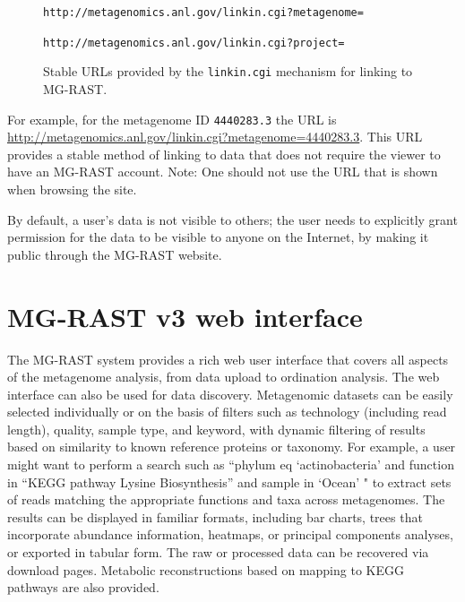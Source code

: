 \documentclass[12pt,fullpage]{report}
\begin{document}
\begin{figure}[ht]

\texttt{http://metagenomics.anl.gov/linkin.cgi?metagenome=}

\texttt{http://metagenomics.anl.gov/linkin.cgi?project=}

\caption{Stable URLs provided by the \texttt{linkin.cgi} mechanism for linking to MG-RAST.}
\label{fig:linkin.cgi}

\end{figure}

\noindent
For example, for the metagenome ID \texttt{4440283.3} the URL is \url{http://metagenomics.anl.gov/linkin.cgi?metagenome=4440283.3}.
This URL provides a stable method of linking to data that does not require the viewer to have an MG-RAST account. Note: One should not use the URL that is shown when browsing the site.

By default, a user's data is not visible to others; the user needs to explicitly grant permission for the data to be visible to anyone on the Internet, by making it public through the MG-RAST website.

\chapter{MG-RAST v3 web interface}

The MG-RAST system provides a rich web user interface that covers all aspects of the metagenome analysis, from data upload to ordination analysis. The web interface can also be used for data discovery. Metagenomic datasets can be easily selected individually or on the basis of filters such as technology (including read length), quality, sample type, and keyword, with dynamic filtering of results based on similarity to known reference proteins or taxonomy. For example, a user might want to perform a search such as ``phylum eq `actinobacteria' and function in “KEGG pathway Lysine Biosynthesis” and sample in `Ocean' " to extract sets of reads matching the appropriate functions and taxa across metagenomes. The results can be displayed in familiar formats, including bar charts, trees that incorporate abundance information, heatmaps, or principal components analyses, or exported in tabular form. The raw or processed data can be recovered via download pages. Metabolic reconstructions based on mapping to KEGG pathways are also provided.
\end{document}
